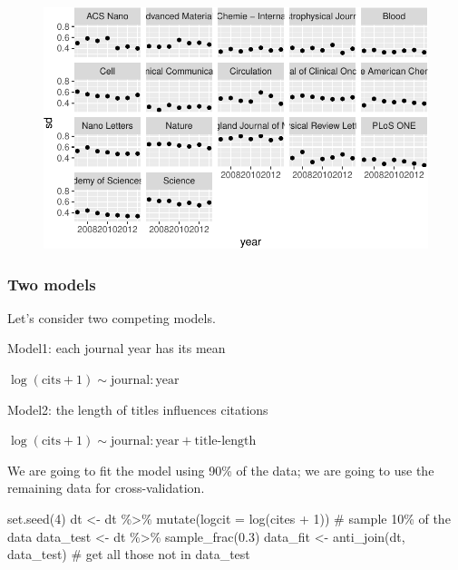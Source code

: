 \documentclass[
  letterpaper,
  DIV=11,
  numbers=noendperiod]{scrreprt}
\newenvironment{Shaded}{\begin{snugshade}}{\end{snugshade}}
\newcommand{\AttributeTok}[1]{\textcolor[rgb]{0.40,0.45,0.13}{#1}}
\newcommand{\CommentTok}[1]{\textcolor[rgb]{0.37,0.37,0.37}{#1}}
\newcommand{\DecValTok}[1]{\textcolor[rgb]{0.68,0.00,0.00}{#1}}
\newcommand{\FloatTok}[1]{\textcolor[rgb]{0.68,0.00,0.00}{#1}}
\newcommand{\FunctionTok}[1]{\textcolor[rgb]{0.28,0.35,0.67}{#1}}
\newcommand{\NormalTok}[1]{\textcolor[rgb]{0.00,0.23,0.31}{#1}}
\newcommand{\OtherTok}[1]{\textcolor[rgb]{0.00,0.23,0.31}{#1}}
\newcommand{\SpecialCharTok}[1]{\textcolor[rgb]{0.37,0.37,0.37}{#1}}
\begin{document}
\begin{figure}[H]

{\centering \includegraphics{./10-model_selection_files/figure-pdf/unnamed-chunk-38-2.pdf}

}

\end{figure}

\hypertarget{two-models}{%
\subsubsection{Two models}\label{two-models}}

Let's consider two competing models.

Model1: each journal year has its mean

\(\log(\text{cits} + 1) \sim \text{journal}:\text{year}\)

Model2: the length of titles influences citations

\(\log(\text{cits} + 1) \sim \text{journal}:\text{year} + \text{title-length}\)

We are going to fit the model using 90\% of the data; we are going to
use the remaining data for cross-validation.

\begin{Shaded}
\begin{Highlighting}[]
\FunctionTok{set.seed}\NormalTok{(}\DecValTok{4}\NormalTok{)}
\NormalTok{dt }\OtherTok{\textless{}{-}}\NormalTok{ dt }\SpecialCharTok{\%\textgreater{}\%} \FunctionTok{mutate}\NormalTok{(}\AttributeTok{logcit =} \FunctionTok{log}\NormalTok{(cites }\SpecialCharTok{+} \DecValTok{1}\NormalTok{))}
\CommentTok{\# sample 10\% of the data}
\NormalTok{data\_test }\OtherTok{\textless{}{-}}\NormalTok{ dt }\SpecialCharTok{\%\textgreater{}\%} \FunctionTok{sample\_frac}\NormalTok{(}\FloatTok{0.3}\NormalTok{)}
\NormalTok{data\_fit  }\OtherTok{\textless{}{-}} \FunctionTok{anti\_join}\NormalTok{(dt, data\_test) }\CommentTok{\# get all those not in data\_test}
\end{Highlighting}
\end{Shaded}
\end{document}
